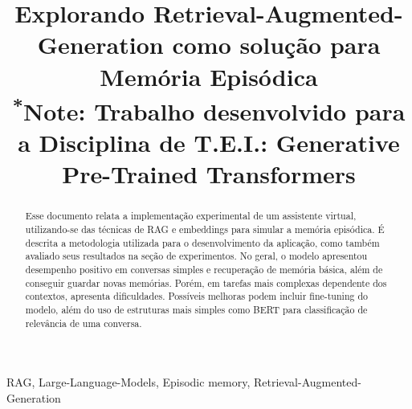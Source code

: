 \documentclass[conference]{IEEEtran}
\begin{document}
\title{Explorando Retrieval-Augmented-Generation como solução para Memória Episódica\\
{\footnotesize \textsuperscript{*}Note: Trabalho desenvolvido para a Disciplina de T.E.I.: Generative Pre-Trained Transformers}
}

\author{
\and
{}
\and
{}
}

\maketitle

\begin{abstract}
Esse documento relata a implementação experimental de um assistente virtual, utilizando-se das técnicas de RAG e embeddings para simular a memória episódica. É descrita a metodologia utilizada para o desenvolvimento da aplicação, como também avaliado seus resultados na seção de experimentos. No geral, o modelo apresentou desempenho positivo em conversas simples e recuperação de memória básica, além de conseguir guardar novas memórias. Porém, em tarefas mais complexas dependente dos contextos, apresenta dificuldades. Possíveis melhoras podem incluir fine-tuning do modelo, além do uso de estruturas mais simples como BERT para classificação de relevância de uma conversa.
\end{abstract}

\begin{IEEEkeywords}
RAG, Large-Language-Models, Episodic memory, Retrieval-Augmented-Generation
\end{IEEEkeywords}
\end{document}
